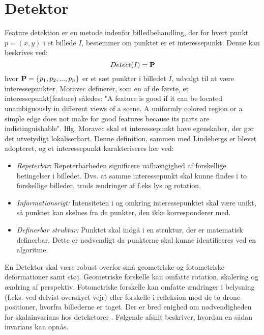 \section{Detektor}\label{sec:detect}
Feature detektion er en metode indenfor billedbehandling, der for hvert punkt $p = (x,y)$ i et billede $I$, bestemmer om punktet er et interessepunkt. Denne kan beskrives ved:
\begin{equation}
Detect(I)= \bold{P}
\label{detect}
\end{equation}
hvor $\bold{P} = \lbrace p_1, p_2,..., p_n \rbrace$ er et sæt punkter i billedet $I$, udvalgt til at være interessepunkter. Moravec \cite{moravec} definerer, som en af de første, et interessepunkt(feature) således: "A
feature is good if it can be located unambiguously in different views of a scene. A
uniformly colored region or a simple edge does not make for good features because
its parts are indistinguishable". Iflg. Moravec skal et interessepunkt have egenskaber, der gør det utvetydigt lokaliserbart. Denne definition, sammen med Lindebergs \cite{pointsurvey} er blevet adopteret, og et interessepunkt karakteriseres her ved:
\begin{itemize}
\item{\emph{Repeterbar}: Repeterbarheden significere uafhængighed af forskellige betingelser i billedet. Dvs. at samme interessepunkt skal kunne findes i to forskellige billeder, trods ændringer af f.eks lys og rotation.}
\item{\emph{Informationsrigt:}
Intensiteten i og omkring interessepunktet skal være unikt, så punktet kan skelnes fra de punkter, den ikke korresponderer med.}
\item{\textit{Definerbar struktur:} Punktet skal indgå i en struktur, der er matematisk definerbar. Dette er nødvendigt da punkterne skal kunne identificeres ved en algoritme.}
\end{itemize}
En Detektor skal være robust overfor små geometriske og fotometriske deformationer samt støj. Geometriske forskelle kan omfatte rotation, skalering og ændring af perspektiv.  Fotometriske forskelle kan omfatte ændringer i belysning (f.eks. ved delvist overskyet vejr) eller forskelle i refleksion mod de to drone-positioner, hvorfra billederne er taget. Der er bred enighed om nødvendigheden for skalainvarians hos deteketorer \cite{koen} \cite{blob} \cite{lindenscale}. Følgende afsnit beskriver, hvordan en sådan invarians kan opnås.
\raggedbottom
\raggedbottom